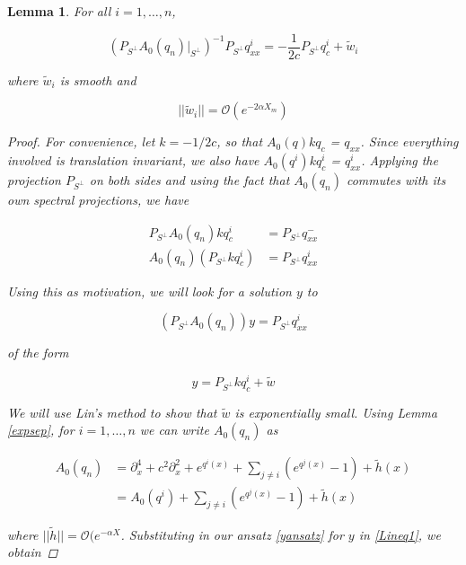 \documentclass[12pt]{article}
\newtheorem{lemma}{Lemma}
\begin{document}
\begin{lemma}\label{Linsolve}
For all $i = 1, \dots, n$,
 
\begin{equation}
(P_{S^\perp} A_0(q_n)|_{S^\perp})^{-1} P_{S^\perp} q^i_{xx} = -\frac{1}{2c}P_{S^\perp} q^i_c
+ \tilde{w}_i
\end{equation}

where $\tilde{w}_i$ is smooth and 

\begin{equation}
||\tilde{w}_i|| = \mathcal{O}(e^{-2 \alpha X_m})
\end{equation}

\begin{proof}
For convenience, let $k = -1/2c$, so that $A_0(q) k q_c$ = $q_{xx}$. Since everything involved is translation invariant, we also have $A_0(q^i) k q^i_c$ = $q^i_{xx}$. Applying the projection $P_{S^\perp}$ on both sides and using the fact that $A_0(q_n)$ commutes with its own spectral projections, we have

\begin{align*}
P_{S^\perp} A_0(q_n) k q^i_c &= P_{S^\perp} q^-_{xx} \\
A_0(q_n) (P_{S^\perp} k q^i_c) &= P_{S^\perp} q^i_{xx}
\end{align*}

Using this as motivation, we will look for a solution $y$ to 

\begin{equation}\label{Lineq1}
(P_{S^\perp} A_0(q_n)) y = P_{S^\perp} q^i_{xx}
\end{equation}

of the form

\begin{equation}\label{yansatz}
y = P_{S^\perp} k q^i_c + \tilde{w}
\end{equation}

We will use Lin's method to show that $\tilde{w}$ is exponentially small. Using Lemma \ref{expsep}, for $i = 1, \dots, n$ we can write $A_0(q_n)$ as 

\begin{align}\label{A0expansion} 
A_0(q_n) &= \partial_x^4 + c^2 \partial_x^2 + e^{q^i(x)} + \sum_{j \neq i} (e^{q^j(x)} - 1) + \tilde{h}(x) \\
&= A_0(q^i) + \sum_{j \neq i} (e^{q^j(x)} - 1) + \tilde{h}(x) \nonumber
\end{align}

where $||\tilde{h}|| = \mathcal{O}(e^{-\alpha X}$. Substituting in our ansatz \eqref{yansatz} for $y$ in \eqref{Lineq1}, we obtain


\end{proof}
\end{lemma}
\end{document}
